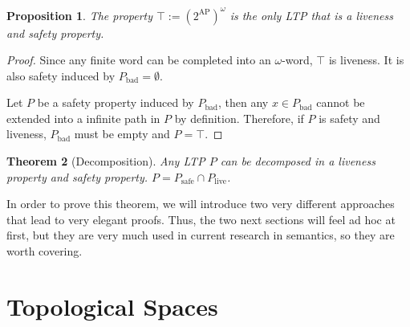 \documentclass{tufte-handout} %
\newtheorem{thm}{Theorem}
\newtheorem{prop}[thm]{Proposition}
\theoremstyle{definition}
\theoremstyle{remark}
\newcommand{\0}{\textsf{0}}
\newcommand{\1}{\textsf{1}}
\newcommand{\AP}{\text{AP}}
\begin{document}

\begin{prop}\label{prop-onlyliveandsafe}
	The property $\top := (2^{\AP})^{\omega}$ is the only LTP that is a liveness and safety property.
\end{prop}
\begin{proof}
	Since any finite word can be completed into an $\omega$-word, $\top$ is liveness. It is also safety induced by $P_{\text{bad}} = \emptyset$.
	
	Let $P$ be a safety property induced by $P_{\text{bad}}$, then any $x \in P_{\text{bad}}$ cannot be extended into a infinite path in $P$ by definition. Therefore, if $P$ is safety and liveness, $P_{\text{bad}}$ must be empty and $P = \top$.
\end{proof}
\begin{thm}[Decomposition]\label{thm-decompltp}
	Any LTP $P$ can be decomposed in a liveness property and safety property. $P = P_{\text{safe}} \cap P_{\text{live}}$.
\end{thm}

In order to prove this theorem, we will introduce two very different approaches that lead to very elegant proofs. Thus, the two next sections will feel ad hoc at first, but they are very much used in current research in semantics, so they are worth covering.

\section{Topological Spaces}
\end{document}
